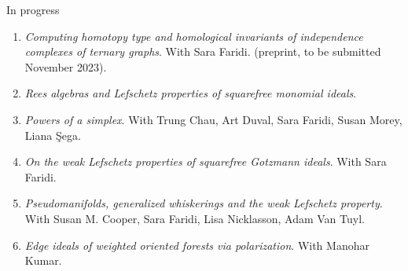 \documentclass{resume} %
\begin{document}
\begin{rSection}{In progress}

    \begin{enumerate}[label = {}]
        \item \textit{Computing homotopy type and homological invariants of independence complexes of ternary graphs}. With Sara Faridi.  (preprint, to be submitted November 2023).
        \item \textit{Rees algebras and Lefschetz properties of squarefree monomial ideals}.
        \item \textit{Powers of a simplex}. With Trung Chau, Art Duval, Sara Faridi, Susan Morey, Liana \c{S}ega.
        \item \textit{On the weak Lefschetz properties of squarefree Gotzmann ideals}. With Sara Faridi. 
        \item \textit{Pseudomanifolds, generalized whiskerings and the weak Lefschetz property}. With Susan M. Cooper, Sara Faridi, Lisa Nicklasson, Adam Van Tuyl. 
        \item \textit{Edge ideals of weighted oriented forests via polarization}. With Manohar Kumar. 
    \end{enumerate}
\end{rSection}

\newpage
\end{document}
